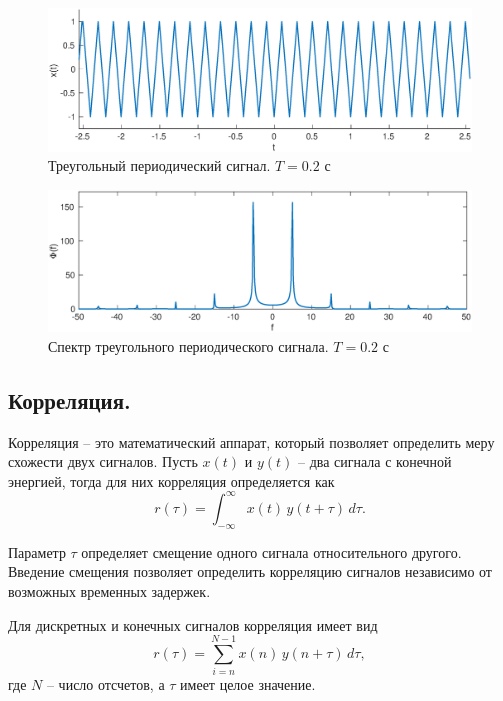 \documentclass[a4paper,14pt]{extarticle}
\begin{document}
\begin{figure}[H]
\includegraphics[width=1\textwidth]{trg_x.eps}
\caption{Треугольный периодический сигнал. $T = 0.2$ с}
\label{trg_x}
\end{figure}

\begin{figure}[H]
\includegraphics[width=1\textwidth]{trg_s.eps}
\caption{Спектр треугольного периодического сигнала. $T = 0.2$ с}
\label{trg_s}
\end{figure}

\subsection{Корреляция.}

Корреляция -- это математический аппарат, который позволяет определить меру схожести двух сигналов. 
Пусть $x(t)$ и $y(t)$ -- два сигнала с конечной энергией, тогда для них корреляция определяется как 
\begin{equation*}
r(\tau) = \int_{-\infty}^{\infty} x(t)\,y(t+\tau)\,d\tau.
\end{equation*} 

Параметр $\tau$ определяет смещение одного сигнала относительного другого. Введение смещения позволяет определить корреляцию сигналов независимо от возможных временных задержек.

Для дискретных и конечных сигналов корреляция имеет вид 
\begin{equation*}
r(\tau) = \sum_{i=n}^{N-1} x(n)\,y(n+\tau)\,d\tau,
\end{equation*} 
где $N$ -- число отсчетов, а $\tau$ имеет целое значение.
\end{document}
